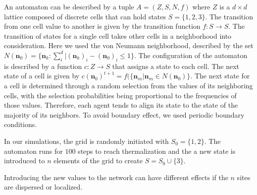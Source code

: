 An automaton can be described by a tuple $A=(Z,S,N,f)$ where $Z$ is a $d\times d$ lattice composed of discrete cells that can hold states $S=\{1,2,3\}$. The transition from one cell value to another 
is given by the transition function $f:S\rightarrow S$. The transition of states for a single cell takes other cells in a neighborhood into consideration. Here we used
the von Neumann neighborhood, described by the set $N(\mathbf{n}_0)=\{\mathbf{n}_k:\sum_i^d|(\mathbf{n}_k)_i-(\mathbf{n}_0)_i\leq 1\}$. The configuration of the automaton
is described by a function $c:Z\rightarrow S$ that assigns a state to each cell. The next state of a cell is given by $c(\mathbf{n}_0)^{t+1}=f(\{\mathbf{n}_m|\mathbf{n}_m\in N(\mathbf{n}_0)\}$.
The next state for a cell is determined through a random selection from the values of its neighboring cells, with the selection probabilities being proportional to the frequencies of those values. 
Therefore, each agent tends to align its state to the state of the majority of its neighbors. To avoid boundary effect, we used periodic boundary conditions.

In our simulations, the grid is randomly initiated with $S_0=\{1,2\}$. The automaton runs for $100$ steps to reach thermalization and the a new state is introduced to $n$ elements of the grid to create $S=S_0\cup\{3\}$.

Introducing the new values to the network can have different effects if the $n$ sites are dispersed or localized. 